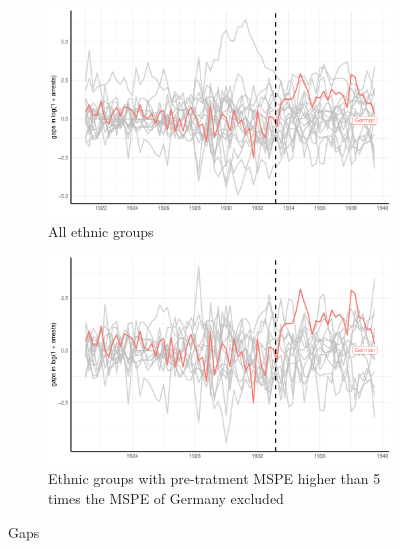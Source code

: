 \begin{figure}[hbtp] 
\begin{subfigure}{\textwidth}
\includegraphics[width=0.9\linewidth]{plots/synthetic_control/until_pact/placebo_highlight_all.pdf}
\caption{All ethnic groups}
\label{fig:sc_placebo_gaps_all}
\end{subfigure}
\begin{subfigure}{\textwidth}
\includegraphics[width=0.9\linewidth]{plots/synthetic_control/until_pact/placebo_highlight_mspe_5_lower.pdf}
\caption{Ethnic groups with pre-tratment MSPE higher than 5 times the MSPE of Germany excluded}
\label{fig:maxvar}
\end{subfigure}
\caption{Gaps}
\label{fig:sc_placebo_gaps}
\end{figure}



